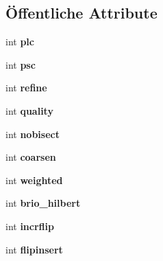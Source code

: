 \subsection*{Öffentliche Attribute}
\begin{DoxyCompactItemize}
\item 
\hypertarget{classtetgenbehavior_a40797ab5b2da5eeb579c6bdfe18b15af}{int {\bfseries plc}}\label{classtetgenbehavior_a40797ab5b2da5eeb579c6bdfe18b15af}

\item 
\hypertarget{classtetgenbehavior_aa0dcda160582fc2d2e39689961c47cfc}{int {\bfseries psc}}\label{classtetgenbehavior_aa0dcda160582fc2d2e39689961c47cfc}

\item 
\hypertarget{classtetgenbehavior_a1db02f7b2524f86a79e5835bece8c6cd}{int {\bfseries refine}}\label{classtetgenbehavior_a1db02f7b2524f86a79e5835bece8c6cd}

\item 
\hypertarget{classtetgenbehavior_ac071721fb930cc08160743886b412889}{int {\bfseries quality}}\label{classtetgenbehavior_ac071721fb930cc08160743886b412889}

\item 
\hypertarget{classtetgenbehavior_a14b1ffe9dae2e1849d22739d2ef3ba20}{int {\bfseries nobisect}}\label{classtetgenbehavior_a14b1ffe9dae2e1849d22739d2ef3ba20}

\item 
\hypertarget{classtetgenbehavior_a58032e83757a8447015fd99d7053db8c}{int {\bfseries coarsen}}\label{classtetgenbehavior_a58032e83757a8447015fd99d7053db8c}

\item 
\hypertarget{classtetgenbehavior_a6ad479e03a42fab8c5f6e4d6adb1be47}{int {\bfseries weighted}}\label{classtetgenbehavior_a6ad479e03a42fab8c5f6e4d6adb1be47}

\item 
\hypertarget{classtetgenbehavior_a26ae57c732cb3e74a94355c9a74c1612}{int {\bfseries brio\-\_\-hilbert}}\label{classtetgenbehavior_a26ae57c732cb3e74a94355c9a74c1612}

\item 
\hypertarget{classtetgenbehavior_a340fcbca73520d6cbd33cc5ef113554d}{int {\bfseries incrflip}}\label{classtetgenbehavior_a340fcbca73520d6cbd33cc5ef113554d}

\item 
\hypertarget{classtetgenbehavior_a42f3d0b7e5592ff2e920128bae4e442b}{int {\bfseries flipinsert}}\label{classtetgenbehavior_a42f3d0b7e5592ff2e920128bae4e442b}


\end{DoxyCompactItemize}
